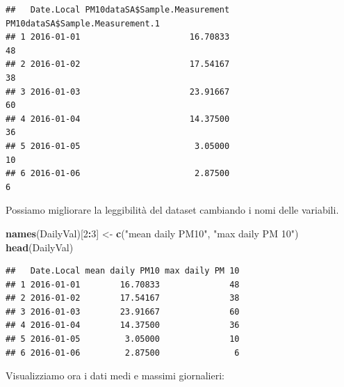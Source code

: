 \documentclass[]{book}
\newenvironment{Shaded}{\begin{snugshade}}{\end{snugshade}}
\newcommand{\DataTypeTok}[1]{\textcolor[rgb]{0.13,0.29,0.53}{#1}}
\newcommand{\DecValTok}[1]{\textcolor[rgb]{0.00,0.00,0.81}{#1}}
\newcommand{\FloatTok}[1]{\textcolor[rgb]{0.00,0.00,0.81}{#1}}
\newcommand{\KeywordTok}[1]{\textcolor[rgb]{0.13,0.29,0.53}{\textbf{#1}}}
\newcommand{\NormalTok}[1]{#1}
\newcommand{\OperatorTok}[1]{\textcolor[rgb]{0.81,0.36,0.00}{\textbf{#1}}}
\newcommand{\StringTok}[1]{\textcolor[rgb]{0.31,0.60,0.02}{#1}}
\begin{document}
\begin{verbatim}
##   Date.Local PM10dataSA$Sample.Measurement PM10dataSA$Sample.Measurement.1
## 1 2016-01-01                      16.70833                              48
## 2 2016-01-02                      17.54167                              38
## 3 2016-01-03                      23.91667                              60
## 4 2016-01-04                      14.37500                              36
## 5 2016-01-05                       3.05000                              10
## 6 2016-01-06                       2.87500                               6
\end{verbatim}

Possiamo migliorare la leggibilità del dataset cambiando i nomi delle variabili.

\begin{Shaded}
\begin{Highlighting}[]
\KeywordTok{names}\NormalTok{(DailyVal)[}\DecValTok{2}\OperatorTok{:}\DecValTok{3}\NormalTok{] <-}\StringTok{ }\KeywordTok{c}\NormalTok{(}\StringTok{"mean daily PM10"}\NormalTok{, }\StringTok{"max daily PM 10"}\NormalTok{)}
\KeywordTok{head}\NormalTok{(DailyVal)}
\end{Highlighting}
\end{Shaded}

\begin{verbatim}
##   Date.Local mean daily PM10 max daily PM 10
## 1 2016-01-01        16.70833              48
## 2 2016-01-02        17.54167              38
## 3 2016-01-03        23.91667              60
## 4 2016-01-04        14.37500              36
## 5 2016-01-05         3.05000              10
## 6 2016-01-06         2.87500               6
\end{verbatim}

Visualizziamo ora i dati medi e massimi giornalieri:

\begin{Shaded}
\end{Shaded}
\end{document}
